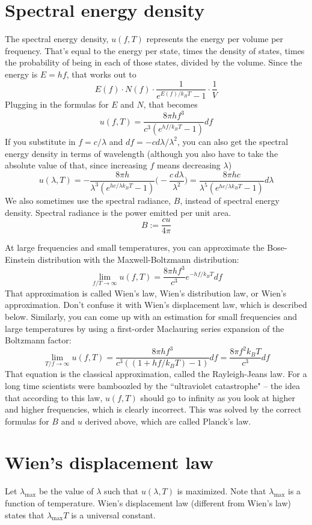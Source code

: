 \documentclass[12pt]{article}
\begin{document}
\section{Spectral energy density}
The spectral energy density, $u(f, T)$ represents the energy per volume per frequency. That's equal to the energy per state, times the density of states, times the probability of being in each of those states, divided by the volume. Since the energy is $E = hf$, that works out to
\[E(f) \cdot N(f) \cdot \frac{1}{e^{E(f)/k_B T} - 1} \cdot \frac{1}{V} \]
Plugging in the formulas for $E$ and $N$, that becomes
\[u(f, T) = \frac{8 \pi h f^3}{c^3 (e^{hf/k_B T} - 1)} df\]
If you substitute in $f = c / \lambda$ and $df = - c d\lambda / \lambda^2$, you can also get the spectral energy density in terms of wavelength (although you also have to take the absolute value of that, since increasing $f$ means decreasing $\lambda$)
\[ u(\lambda, T) = - \frac{8 \pi h}{\lambda^3 (e^{h c / \lambda k_B T} - 1)} \Bigg( - \frac{c \, d\lambda}{\lambda^2} \Bigg) = \frac{8 \pi h c}{\lambda^5 (e^{h c / \lambda k_B T} - 1)} d\lambda \]
We also sometimes use the spectral radiance, $B$, instead of spectral energy density. Spectral radiance is the power emitted per unit area.
\[ B := \frac{c u}{4 \pi} \]

At large frequencies and small temperatures, you can approximate the Bose-Einstein distribution with the Maxwell-Boltzmann distribution:
\[ \lim_{f/T \rightarrow \infty} u(f, T) = \frac{8 \pi h f^3}{c^3} e^{-hf/k_B T} df \]
That approximation is called Wien's law, Wien's distribution law, or Wien's approximation. Don't confuse it with Wien's displacement law, which is described below. Similarly, you can come up with an estimation for small frequencies and large temperatures by using a first-order Maclauring series expansion of the Boltzmann factor:
\[ \lim_{T/f \rightarrow \infty} u(f, T) = \frac{8 \pi h f^3}{c^3 ((1 + hf/k_B T) - 1)} df  = \frac{8 \pi f^2 k_B T}{c^3} df \]
That equation is the classical approximation, called the Rayleigh-Jeans law. For a long time scientists were bamboozled by the ``ultraviolet catastrophe" -- the idea that according to this law, $u(f, T)$ should go to infinity as you look at higher and higher frequencies, which is clearly incorrect. This was solved by the correct formulas for $B$ and $u$ derived above, which are called Planck's law.

\section{Wien's displacement law}
Let $\lambda_{\text{max}}$ be the value of $\lambda$ such that $u(\lambda, T)$ is maximized. Note that $\lambda_\text{max}$ is a function of temperature. Wien's displacement law (different from Wien's law) states that $\lambda_\text{max} T$ is a universal constant.
\end{document}
